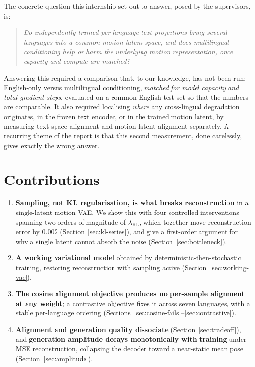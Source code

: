 \documentclass[11pt,a4paper]{report}
\newcommand{\lkl}{\ensuremath{\lambda_{\mathrm{KL}}}}
\begin{document}
The concrete question this internship set out to answer, posed by the
supervisors, is:

\begin{quote}
\emph{Do independently trained per-language text projections bring several
languages into a common motion latent space, and does multilingual
conditioning help or harm the underlying motion representation, once
capacity and compute are matched?}
\end{quote}

Answering this required a comparison that, to our knowledge, has not been
run: English-only versus multilingual conditioning, \emph{matched for
model capacity and total gradient steps}, evaluated on a common English
test set so that the numbers are comparable. It also required localising
\emph{where} any cross-lingual degradation originates, in the frozen
text encoder, or in the trained motion latent, by measuring text-space
alignment and motion-latent alignment separately. A recurring theme of the
report is that this second measurement, done carelessly, gives exactly the
wrong answer.

\section{Contributions}

\begin{enumerate}[leftmargin=*]
\item \textbf{Sampling, not KL regularisation, is what breaks
 reconstruction} in a single-latent motion VAE. We show this with four
 controlled interventions spanning two orders of magnitude of \lkl{},
 which together move reconstruction error by $0.002$
 (Section~\ref{sec:kl-series}), and give a first-order argument for why a
 single latent cannot absorb the noise (Section~\ref{sec:bottleneck}).
\item \textbf{A working variational model} obtained by
 deterministic-then-stochastic training, restoring reconstruction with
 sampling active (Section~\ref{sec:working-vae}).
\item \textbf{The cosine alignment objective produces no per-sample
 alignment at any weight}; a contrastive objective fixes it across seven
 languages, with a stable per-language ordering
 (Sections~\ref{sec:cosine-fails}--\ref{sec:contrastive}).
\item \textbf{Alignment and generation quality dissociate}
 (Section~\ref{sec:tradeoff}), and \textbf{generation amplitude decays
 monotonically with training} under MSE reconstruction, collapsing the
 decoder toward a near-static mean pose (Section~\ref{sec:amplitude}).
\end{enumerate}
\end{document}
